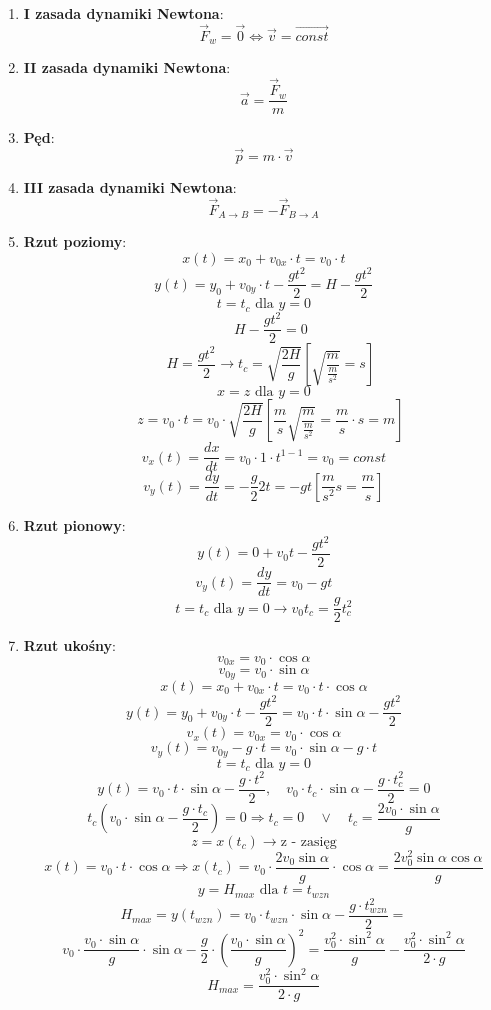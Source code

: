 \documentclass{article}
\begin{document}
\begin{enumerate}
		\item \textbf{I zasada dynamiki Newtona}:
		\[
		\vec{F}_w = \vec{0} \iff \vec{v} = \overrightarrow{const}
		\]
		
		\item \textbf{II zasada dynamiki Newtona}:
		\[
		\vec{a} = \frac{\vec{F}_w}{m}
		\]
		
		\item \textbf{Pęd}:
		\[
		\vec{p} = m \cdot \vec{v}
		\]
		
		\item \textbf{III zasada dynamiki Newtona}:
		\[
		\vec{F}_{A \to B} = -\vec{F}_{B \to A}
		\]
		
		\item \textbf{Rzut poziomy}:
		\[
		x(t) = x_0 + v_{0x} \cdotp t = v_0 \cdotp t
		\]
		\[
		y(t) = y_0 + v_{0y} \cdotp t - \frac{gt^2}{2} = H - \frac{gt^2}{2}
		\]
		\[
		t = t_c \text{ dla } y = 0
		\]
		\[
		\quad H - \frac{gt^2}{2} = 0
		\]
		\[
		\quad H = \frac{gt^2}{2} \rightarrow t_c = \sqrt{\frac{2H}{g}} \left[ \sqrt{\frac{m}{\frac{m}{s^2}}} = s \right]
		\]
		\[
		x = z \text{ dla } y = 0
		\]
		\[
		\quad z = v_0 \cdotp t = v_0 \cdotp \sqrt{\frac{2H}{g}} \left[ \frac{m}{s} \sqrt{\frac{m}{\frac{m}{s^2}}} = \frac{m}{s} \cdotp s = m \right]
		\]
		\[
		v_x(t) = \frac{dx}{dt} = v_0 \cdotp 1 \cdotp t^{1-1} = v_0 = const
		\]
		\[
		v_y(t) = \frac{dy}{dt} = - \frac{g}{2} 2t = -gt \left[ \frac{m}{s^2}s = \frac{m}{s} \right]
		\]
		
		\item \textbf{Rzut pionowy}:
		\[
		y(t) = 0 + v_0t - \frac{gt^2}{2}
		\]
		\[
		v_y(t) = \frac{dy}{dt} = v_0 - gt
		\]
		\[
		t = t_c \text{ dla } y = 0 \rightarrow v_0t_c = \frac{g}{2} t_c^2
		\]
		
		\item \textbf{Rzut ukośny}:
		\[
		v_{0x} = v_0 \cdotp \cos\alpha
		\]
		\[
		v_{0y} = v_0 \cdotp \sin\alpha
		\]
		\[
		x(t) = x_0 + v_{0x} \cdotp t = v_0 \cdotp t \cdotp \cos\alpha
		\]
		\[
		y(t) = y_0 + v_{0y} \cdotp t - \frac{gt^2}{2} = v_0 \cdotp t \cdotp \sin\alpha - \frac{gt^2}{2}
		\]
		\[
		v_x(t) = v_{0x} = v_0 \cdotp \cos\alpha
		\]
		\[
		v_y(t) = v_{0y} - g \cdotp t = v_0 \cdotp \sin\alpha - g \cdotp t
		\]
		\[
		t = t_c \text{ dla } y = 0
		\]
		\[
		y(t) = v_0 \cdotp t \cdotp \sin\alpha - \frac{g \cdotp t^2}{2}, \quad v_0 \cdotp t_c \cdotp \sin\alpha - \frac{g \cdotp t_c^2}{2} = 0
		\]
		\[
		t_c \left( v_0 \cdotp \sin\alpha - \frac{g \cdotp t_c}{2} \right) = 0 \Rightarrow t_c = 0 \quad \vee \quad t_c = \frac{2v_0 \cdot \sin\alpha}{g}
		\]
		\[
		z = x(t_c) \longrightarrow \text{z - zasięg}
		\]
		\[
		x(t) = v_0 \cdot t \cdotp \cos\alpha \Rightarrow x(t_c) = v_0 \cdotp \frac{2v_0\sin\alpha}{g} \cdotp \cos\alpha = \frac{2v_0^2 \sin\alpha \cos\alpha}{g}
		\]
		\[
		y = H_{max} \text{ dla } t = t_{wzn}
		\]
		\[
		H_{max} = y(t_{wzn}) = v_0 \cdotp t_{wzn} \cdotp \sin\alpha - \frac{g \cdotp t_{wzn}^2}{2} =
		\]
		\[
		 v_0 \cdotp \frac{v_0 \cdotp \sin\alpha}{g} \cdotp \sin\alpha - \frac{g}{2} \cdotp \left( \frac{v_0 \cdotp \sin\alpha}{g} \right)^2 = \frac{v_0^2 \cdotp \sin^2 \alpha}{g} - \frac{v_0^2 \cdotp \sin^2 \alpha}{2 \cdotp g}
		\]
		\[
		H_{max} = \frac{v_0^2 \cdotp \sin^2 \alpha}{2 \cdotp g}
		\]
		

\end{enumerate}
\end{document}
